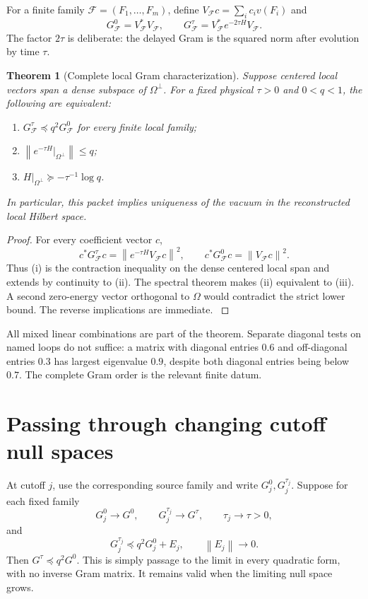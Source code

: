 \documentclass[11pt,oneside,openany]{book}
\newtheorem{theorem}{Theorem}[chapter]
\theoremstyle{definition}
\theoremstyle{remark}
\newcommand{\norm}[1]{\left\lVert#1\right\rVert}
\newcommand{\src}[2]{\cite[#2]{#1}}
\begin{document}
For a finite family $\mathcal F=(F_1,\ldots,F_m)$, define $V_{\mathcal F}c=\sum_ic_iv(F_i)$ and
\begin{equation}\label{eq:localGrams}
G_{\mathcal F}^{0}=V_{\mathcal F}^*V_{\mathcal F},\qquad
G_{\mathcal F}^{\tau}=V_{\mathcal F}^*e^{-2\tau H}V_{\mathcal F}.
\end{equation}
The factor $2\tau$ is deliberate: the delayed Gram is the squared norm after evolution by time $\tau$.

\begin{theorem}[Complete local Gram characterization]\label{thm:local-Gram}
Suppose centered local vectors span a dense subspace of $\Omega^\perp$. For a fixed physical $\tau>0$ and $0<q<1$, the following are equivalent:
\begin{enumerate}[label=\textup{(\roman*)},leftmargin=2.5em]
\item $G_{\mathcal F}^{\tau}\preceq q^2G_{\mathcal F}^{0}$ for every finite local family;
\item $\norm{e^{-\tau H}|_{\Omega^\perp}}\le q$;
\item $H|_{\Omega^\perp}\succeq-\tau^{-1}\log q$.
\end{enumerate}
In particular, this packet implies uniqueness of the vacuum in the reconstructed local Hilbert space.
\end{theorem}
\begin{proof}
For every coefficient vector $c$,
\[
c^*G_{\mathcal F}^{\tau}c
=\norm{e^{-\tau H}V_{\mathcal F}c}^2,
\qquad c^*G_{\mathcal F}^{0}c=\norm{V_{\mathcal F}c}^2.
\]
Thus (i) is the contraction inequality on the dense centered local span and extends by continuity to (ii). The spectral theorem makes (ii) equivalent to (iii). A second zero-energy vector orthogonal to $\Omega$ would contradict the strict lower bound. The reverse implications are immediate. \src{F1}{V1}
\end{proof}

All mixed linear combinations are part of the theorem. Separate diagonal tests on named loops do not suffice: a matrix with diagonal entries $0.6$ and off-diagonal entries $0.3$ has largest eigenvalue $0.9$, despite both diagonal entries being below $0.7$. The complete Gram order is the relevant finite datum.

\section{Passing through changing cutoff null spaces}
At cutoff $j$, use the corresponding source family and write $G_j^0,G_j^{\tau_j}$. Suppose for each fixed family
\begin{equation}\label{eq:Gram-convergence}
G_j^0\to G^0,\qquad G_j^{\tau_j}\to G^\tau,
\qquad \tau_j\to\tau>0,
\end{equation}
and
\begin{equation}\label{eq:Gram-error}
G_j^{\tau_j}\preceq q^2G_j^0+E_j,\qquad \norm{E_j}\to0.
\end{equation}
Then $G^\tau\preceq q^2G^0$. This is simply passage to the limit in every quadratic form, with no inverse Gram matrix. It remains valid when the limiting null space grows.
\end{document}
